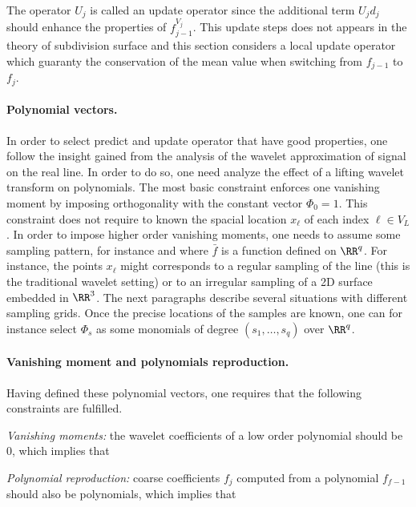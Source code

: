 The operator $U_j$ is called an update operator since the additional term $U_j d_j$ should enhance the properties of $f_{j-1}^{V_j}$. This update steps does not appears in the theory of subdivision surface and this section considers a local update operator which guaranty the conservation of the mean value when switching from $f_{j-1}$ to $f_j$.

\paragraph{Polynomial vectors.}

In order to select predict and update operator that have good properties, one follow the insight gained from the analysis of the wavelet approximation of signal on the real line. In order to do so, one need analyze the effect of a lifting wavelet transform on polynomials. The most basic constraint enforces one vanishing moment by imposing orthogonality with the constant vector $\Phi_0 = 1$. This constraint does not require to known the spacial location $x_\ell$ of each index $\ell \in V_L$. In order to impose higher order vanishing moments, one needs to assume some sampling pattern, for instance
and where $\bar f$ is a function defined on $\RR^q$. For instance, the points $x_\ell$ might corresponds to a regular sampling of the line (this is the traditional wavelet setting) or to an irregular sampling of a 2D surface embedded in $\RR^3$. The next paragraphs describe several situations with different sampling grids. Once the precise locations of the samples are known, one can for instance select $\Phi_s$ as some monomials of degree $(s_1,\ldots,s_q)$ over $\RR^q$.

\paragraph{Vanishing moment and polynomials reproduction.}

Having defined these polynomial vectors, one requires that the following constraints are fulfilled. 
\begin{rs}
	\item \textit{Vanishing moments:} the wavelet coefficients of a low order polynomial should be 0, which implies that
	\item \textit{Polynomial reproduction:} coarse coefficients $f_j$ computed from a polynomial $f_{f-1}$ should also be polynomials, which implies that
\end{rs}

